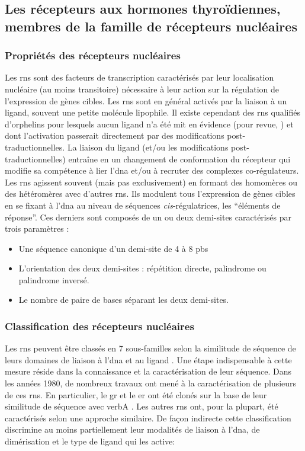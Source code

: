 \documentclass[../main.tex]{subfiles}
\begin{document}

\subsection{Les récepteurs aux hormones thyroïdiennes, membres de la famille de récepteurs nucléaires}\label{subsubsec:TR}

\subsubsection{Propriétés des récepteurs nucléaires}
Les \glspl{rn} sont des facteurs de transcription caractérisés par leur localisation nucléaire (au moins transitoire) nécessaire à leur action sur la régulation de l'expression de gènes cibles.
Les \glspl{rn} sont en général activés par la liaison à un ligand, souvent une petite molécule lipophile.
Il existe cependant des \glspl{rn} qualifiés d'orphelins pour lesquels aucun ligand n'a été mit en évidence (pour revue, \citealp{Giguere1999}) et dont l'activation passerait directement par des modifications post-traductionnelles.
La liaison du ligand (et/ou les modifications post-traductionnelles) entraîne en un changement de conformation du récepteur qui modifie sa compétence à lier l'\gls{dna} et/ou à recruter des complexes co-régulateurs.
Les \glspl{rn} agissent souvent (mais pas exclusivement) en formant des homomères ou des hétéromères avec d'autres \glspl{rn}.
Ils modulent tous l'expression de gènes cibles en se fixant à l'\gls{dna} au niveau de séquences \textit{cis}-régulatrices, les ``éléments de réponse''.
Ces derniers sont composés de un ou deux demi-sites caractérisés par trois paramètres :
\begin{itemize}
\item Une séquence canonique d'un demi-site de 4 à 8 \glspl{pb}
\item L'orientation des deux demi-sites : répétition directe, palindrome ou palindrome inversé.	
\item Le nombre de paire de bases séparant les deux demi-sites.
\end{itemize}

\subsubsection{Classification des récepteurs nucléaires}
Les \glspl{rn} peuvent être classés en 7 sous-familles selon la similitude de séquence de leurs domaines de liaison à l'\gls{dna} et au ligand \citep{Laudet1997,Committee1999}.
Une étape indispensable à cette mesure réside dans la connaissance et la caractérisation de leur séquence.
Dans les années 1980, de nombreux travaux ont mené à la caractérisation de plusieurs de ces \glspl{rn}.
En particulier, le \gls{gr} et le \gls{er} ont été clonés sur la base de leur similitude de séquence avec \gls{verbA} \citep{Hollenberg1985, Green1986}.
Les autres \glspl{rn} ont, pour la plupart, été caractérisés selon une approche similaire.
De façon indirecte cette classification discrimine au moins partiellement leur modalités de liaison à l'\gls{dna}, de dimérisation et le type de ligand qui les active:
\end{document}

